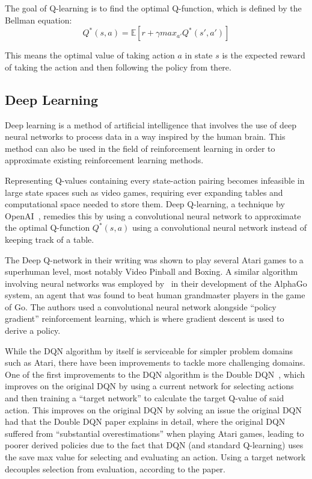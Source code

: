 \documentclass[12pt,a4paper]{article}
\begin{document}
    The goal of Q-learning is to find the optimal Q-function, which is defined by the Bellman equation:
    \[Q^{*}(s, a) = \mathbb{E} [r + \gamma max_{a'} Q^{*}(s', a')]\]

    This means the optimal value of taking action \(a\) in state \(s\) is the expected reward of taking the action and then following the policy from there.

    \subsection{Deep Learning}\label{subsec:deep-learning}
    Deep learning is a method of artificial intelligence that involves the use of deep neural networks to process data in a way inspired by the human brain.
    This method can also be used in the field of reinforcement learning in order to approximate existing reinforcement learning methods.

    Representing Q-values containing every state-action pairing becomes infeasible in large state spaces such as video
    games, requiring ever expanding tables and computational space needed to store them.
    Deep Q-learning, a technique by OpenAI~\citep{mnih15}, remedies this by using a convolutional neural network to
    approximate the optimal Q-function \(Q^*(s, a)\) using a convolutional neural network instead of keeping track of
    a table.

    The Deep Q-network in their writing was shown to play several Atari games to a superhuman level, most notably Video Pinball and Boxing.
    A similar algorithm involving neural networks was employed by~\citet{silver16} in their development of the AlphaGo system, an agent that was found to beat human grandmaster players in the game of Go.
    The authors used a convolutional neural network alongside ``policy gradient'' reinforcement learning, which is where gradient descent is used to derive a policy.

    While the DQN algorithm by itself is serviceable for simpler problem domains such as Atari, there have been improvements to tackle more challenging domains.
    One of the first improvements to the DQN algorithm is the Double DQN~\citep{hasselt15}, which improves on the original DQN by using a current network for selecting actions
    and then training a ``target network'' to calculate the target Q-value of said action.
    This improves on the original DQN by solving an issue the original DQN had that the Double DQN paper explains in detail,
    where the original DQN suffered from ``substantial overestimations'' when playing Atari games, leading to poorer derived policies due to the fact that
    DQN (and standard Q-learning) uses the save max value for selecting and evaluating an action.
    Using a target network decouples selection from evaluation, according to the paper.
\end{document}
